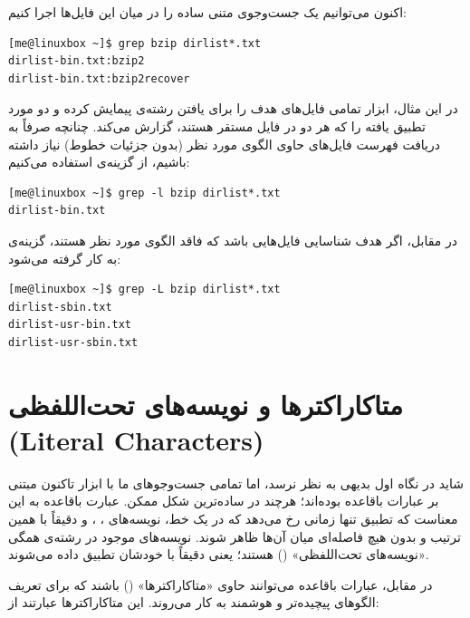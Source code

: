 اکنون می‌توانیم یک جست‌وجوی متنی ساده را در میان این فایل‌ها اجرا کنیم:

\begin{latin}
\begin{lstlisting}
[me@linuxbox ~]$ grep bzip dirlist*.txt
dirlist-bin.txt:bzip2
dirlist-bin.txt:bzip2recover
\end{lstlisting}
\end{latin}

در این مثال، ابزار  تمامی فایل‌های هدف را برای یافتن رشته‌ی  پیمایش کرده و دو مورد تطبیق یافته را که هر دو در فایل  مستقر هستند، گزارش می‌کند. چنانچه صرفاً به دریافت فهرست فایل‌های حاوی الگوی مورد نظر (بدون جزئیات خطوط) نیاز داشته باشیم، از گزینه‌ی  استفاده می‌کنیم:

\begin{latin}
\begin{lstlisting}
[me@linuxbox ~]$ grep -l bzip dirlist*.txt
dirlist-bin.txt
\end{lstlisting}
\end{latin}

در مقابل، اگر هدف شناسایی فایل‌هایی باشد که فاقد الگوی مورد نظر هستند، گزینه‌ی  به کار گرفته می‌شود:

\begin{latin}
\begin{lstlisting}
[me@linuxbox ~]$ grep -L bzip dirlist*.txt
dirlist-sbin.txt
dirlist-usr-bin.txt
dirlist-usr-sbin.txt
\end{lstlisting}
\end{latin}

\section{متاکاراکترها و نویسه‌های تحت‌اللفظی (Literal Characters)}

شاید در نگاه اول بدیهی به نظر نرسد، اما تمامی جست‌وجوهای ما با ابزار  تاکنون مبتنی بر عبارات باقاعده بوده‌اند؛ هرچند در ساده‌ترین شکل ممکن. عبارت باقاعده  به این معناست که تطبیق تنها زمانی رخ می‌دهد که در یک خط، نویسه‌های ، ،  و  دقیقاً با همین ترتیب و بدون هیچ فاصله‌ای میان آن‌ها ظاهر شوند. نویسه‌های موجود در رشته‌ی  همگی «نویسه‌های تحت‌اللفظی» () هستند؛ یعنی دقیقاً با خودشان تطبیق داده می‌شوند.

در مقابل، عبارات باقاعده می‌توانند حاوی «متاکاراکترها» () باشند که برای تعریف الگوهای پیچیده‌تر و هوشمند به کار می‌روند. این متاکاراکترها عبارتند از:

